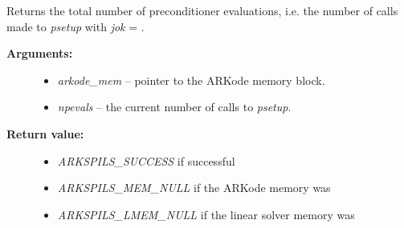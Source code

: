 \documentclass[letterpaper,10pt,english]{sphinxmanual}
\begin{document}
\begin{fulllineitems}
\label{c_interface/User_callable:ARKSpilsGetNumPrecEvals}
Returns the total number of preconditioner evaluations,
i.e. the number of calls made to \emph{psetup} with \emph{jok} = .
\begin{description}
\item[{\textbf{Arguments:}}] \leavevmode\begin{itemize}
\item {} 
\emph{arkode\_mem} -- pointer to the ARKode memory block.

\item {} 
\emph{npevals} -- the current number of calls to \emph{psetup}.

\end{itemize}

\item[{\textbf{Return value:}}] \leavevmode\begin{itemize}
\item {} 
\emph{ARKSPILS\_SUCCESS} if successful

\item {} 
\emph{ARKSPILS\_MEM\_NULL} if the ARKode memory was 

\item {} 
\emph{ARKSPILS\_LMEM\_NULL} if the linear solver memory was 

\end{itemize}

\end{description}

\end{fulllineitems}

\end{document}
